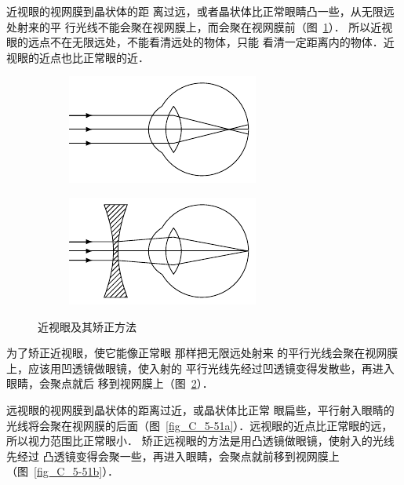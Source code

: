 近视眼的视网膜到晶状体的距
离过远，或者晶状体比正常眼睛凸一些，从无限远处射来的平
行光线不能会聚在视网膜上，而会聚在视网膜前（图~\ref{fig_C_5-50a}）．
所以近视眼的远点不在无限远处，不能看清远处的物体，只能
看清一定距离内的物体．近视眼的近点也比正常眼的近．
\begin{figure}[htbp]
    \centering
    \begin{subfigure}{0.4\linewidth}
        \centering
        \includegraphics{fig/C/5-50a.pdf}
        \caption{}\label{fig_C_5-50a}
    \end{subfigure}
    \hfil
    \begin{subfigure}{0.4\linewidth}
        \centering
        \includegraphics{fig/C/5-50b.pdf}
        \caption{}\label{fig_C_5-50b}
    \end{subfigure}
    \caption{近视眼及其矫正方法}\label{fig_C_5-50}
\end{figure}

为了矫正近视眼，使它能像正常眼
那样把无限远处射来
的平行光线会聚在视网膜上，应该用凹透镜做眼镜，使入射的
平行光线先经过凹透镜变得发散些，再进入眼睛，会聚点就后
移到视网膜上（图~\ref{fig_C_5-50b}）．

远视眼的视网膜到晶状体的距离过近，或晶状体比正常
眼扁些，平行射入眼睛的光线将会聚在视网膜的后面（图~\ref{fig_C_5-51a}）．远视眼的近点比正常眼的远，所以视力范围比正常眼小．
矫正远视眼的方法是用凸透镜做眼镜，使射入的光线先经过
凸透镜变得会聚一些，再进入眼睛，会聚点就前移到视网膜上（图~\ref{fig_C_5-51b}）．

